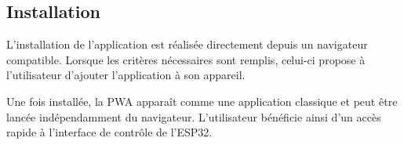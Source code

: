 \subsection{Installation}

L'installation de l'application est réalisée directement depuis un navigateur compatible. Lorsque les critères nécessaires sont remplis, celui-ci propose à l'utilisateur d'ajouter l'application à son appareil.

Une fois installée, la PWA apparaît comme une application classique et peut être lancée indépendamment du navigateur. L'utilisateur bénéficie ainsi d'un accès rapide à l'interface de contrôle de l'ESP32.
